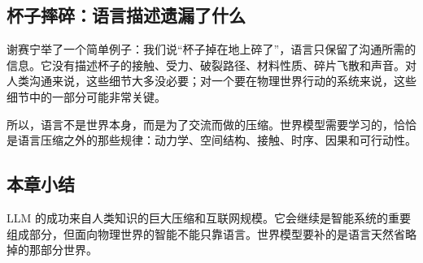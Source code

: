\subsection{杯子摔碎：语言描述遗漏了什么}

谢赛宁举了一个简单例子：我们说“杯子掉在地上碎了”，语言只保留了沟通所需的信息。它没有描述杯子的接触、受力、破裂路径、材料性质、碎片飞散和声音。对人类沟通来说，这些细节大多没必要；对一个要在物理世界行动的系统来说，这些细节中的一部分可能非常关键。

所以，语言不是世界本身，而是为了交流而做的压缩。世界模型需要学习的，恰恰是语言压缩之外的那些规律：动力学、空间结构、接触、时序、因果和可行动性。

\subsection{本章小结}

LLM 的成功来自人类知识的巨大压缩和互联网规模。它会继续是智能系统的重要组成部分，但面向物理世界的智能不能只靠语言。世界模型要补的是语言天然省略掉的那部分世界。

